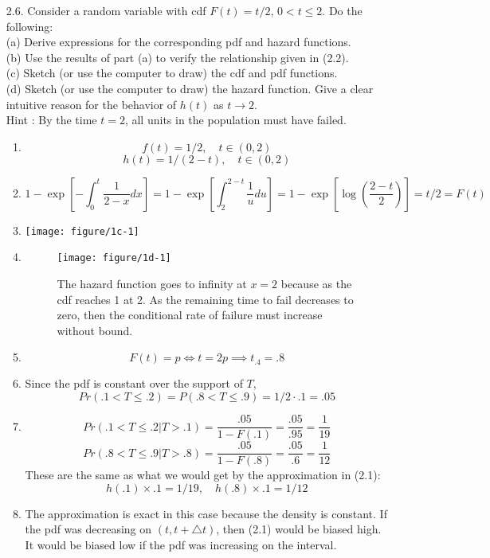 \documentclass[12pt]{article}\usepackage[]{graphicx}\usepackage[]{color}
\newenvironment{knitrout}{}{} %
\begin{document}
\begin{enumerate}
\item[2.6.] Consider a random variable with cdf $F(t) = t/2$, $0 < t \le 2$. Do the following:\\
  (a) Derive expressions for the corresponding pdf and hazard functions.\\
(b) Use the results of part (a) to verify the relationship given in (2.2).\\
(c) Sketch (or use the computer to draw) the cdf and pdf functions.\\
(d) Sketch (or use the computer to draw) the hazard function. Give a clear intuitive reason for the behavior of $h(t)$ as $t  \rightarrow 2$.\\
Hint : By the time $t = 2$, all units in the population must have failed.
\begin{enumerate}
  \item \[f(t) = 1/2, \quad t\in (0,2)\]
  \[h(t) = 1/(2-t), \quad t \in (0,2)\]
  \item 
  \[1-\exp\left[ -\int_{0}^{t}\frac{1}{2-x}dx\right] = 1-\exp\left[\int_{2}^{2-t}\frac{1}{u}du\right] = 1-\exp\left[ \log\left(\frac{2-t}{2}\right) \right] = t/2=F(t)\]
  \item
\begin{knitrout}
\color{fgcolor}
\texttt{[image: figure/1c-1]} 

\end{knitrout}
  \item 
\begin{knitrout}
\color{fgcolor}\begin{figure}[ht]
\texttt{[image: figure/1d-1]} \caption[The hazard function goes to infinity at ]{The hazard function goes to infinity at $x=2$ because as the cdf reaches 1 at 2. As the remaining time to fail decreases to zero, then the conditional rate of failure must increase without bound.}\label{fig:1d}
\end{figure}


\end{knitrout}
 \item
 \[F(t)=p \iff t=2p \implies t_{.4}=.8\]
 \item
 Since the pdf is constant over the support of $T$,
 \[Pr(.1<T\le.2) = P(.8<T\le.9) = 1/2 \cdot .1 = .05\]
 \item
 \[Pr(.1<T\le.2|T>.1) = \frac{.05}{1-F(.1)}=\frac{.05}{.95} = \frac{1}{19}\]
  \[Pr(.8<T\le.9|T>.8) = \frac{.05}{1-F(.8)}=\frac{.05}{.6} = \frac{1}{12}\]
  These are the same as what we would get by the approximation in (2.1):
  \[h(.1)\times.1 = 1/19,\quad h(.8)\times.1 = 1/12\]
 \item
 The approximation is exact in this case because the density is constant. If the pdf was decreasing on $(t,t+\triangle t)$, then (2.1) would be biased high. It would be biased low if the pdf was increasing on the interval.
\end{enumerate}


\end{enumerate}
\end{document}
